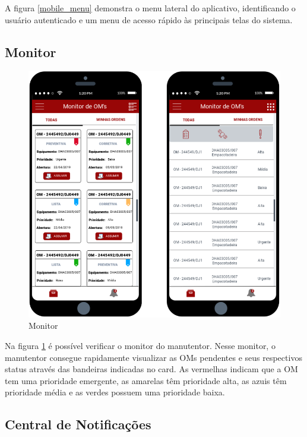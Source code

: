{	A figura \ref{mobile_menu} demonstra o menu lateral do aplicativo, identificando o usuário autenticado e um menu de acesso rápido às principais telas do sistema.
	
	\newpage
	\subsection{Monitor}
	
	\begin{figure}[htb]
		\caption{\label{mobile_monitor}Monitor}
		\begin{center}
			\includegraphics[scale=0.75]{./Figuras/mobile/monitor.png}
		\end{center}
	\end{figure}
	
	Na figura \ref{mobile_monitor} é possível verificar o monitor do manutentor. Nesse monitor, o manutentor consegue rapidamente visualizar as OMs pendentes e seus respectivos status através das bandeiras indicadas no card. As  vermelhas indicam que a OM tem uma prioridade emergente, as amarelas têm prioridade alta, as azuis têm prioridade média e as verdes possuem uma prioridade baixa.
	
	\newpage
	\subsection{Central de Notificações}
	
}
